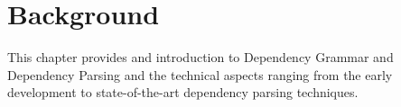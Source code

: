 \chapter{Background}
\label{chap:background}

This chapter provides and introduction to Dependency Grammar and Dependency
Parsing and the technical aspects ranging from the early development to state-of-the-art
dependency parsing techniques. 